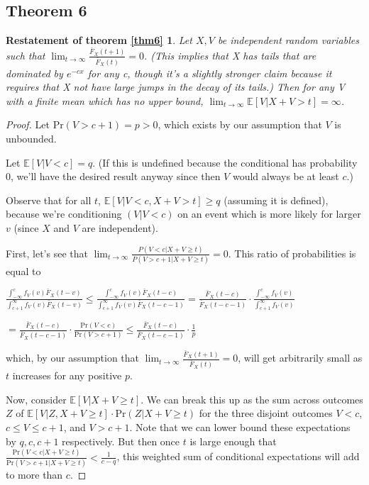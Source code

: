 \documentclass{article}
\begin{document}
\subsection{Theorem 6}
\newtheorem*{theorem6}{Restatement of theorem \ref{thm6}}
\begin{theorem6}
    Let $X, V$ be independent random variables such that $\lim_{t\to\infty}\frac{\bar{F}_X(t+1)}{\bar{F}_X(t)}=0$. (This implies that X has tails that are dominated by $e^{-cx}$ for any c, though it's a slightly stronger claim because it requires that X not have large jumps in the decay of its tails.)
    Then for any V with a finite mean which has no upper bound, $\lim_{t\to\infty}\mathbb{E}[V|X+V > t] = \infty$. 
\end{theorem6}
\begin{proof}
Let \(\text{Pr}(V>c+1)=p>0\), which exists by our assumption that \(V\) is unbounded.

Let \(\mathbb E[V|V<c] = q\). (If this is undefined because the conditional has probability \(0\), we'll have the desired result anyway since then \(V\) would always be at least \(c\).) 

Observe that for all \(t\), \(\mathbb E[V|V<c, X+V>t] \ge q\) (assuming it is defined), because we're conditioning \((V|V<c)\) on an event which is more likely for larger \(v\) (since \(X\) and \(V\) are independent). 

First, let's see that \(\lim_{t\to\infty}\frac{P(V<c|X+V\ge t)}{P(V>c+1|X+V\ge t)}=0\). This ratio of probabilities is equal to

\(\frac{\int_{-\infty}^c f_V(v)\bar F_X(t-v)}{\int_{c+1}^\infty f_V(v)\bar F_X(t-v)} \le \frac{\int_{-\infty}^c f_V(v)\bar F_X(t-c)}{\int_{c+1}^\infty f_V(v)\bar F_X(t-c-1)} = \frac{\bar F_X(t-c)}{\bar F_X(t-c-1)}\cdot \frac{\int_{-\infty}^c f_V(v)}{\int_{c+1}^\infty f_V(v)}\)

\(=\frac{\bar F_X(t-c)}{\bar F_X(t-c-1)}\cdot \frac{\text{Pr}(V<c)}{\text{Pr}(V>c+1)}\le \frac{\bar F_X(t-c)}{\bar F_X(t-c-1)}\cdot \frac1p\)

which, by our assumption that \(\lim_{t\to\infty}\frac{\bar{F}_X(t+1)}{\bar{F}_X(t)}=0\), will get arbitrarily small as \(t\) increases for any positive \(p\).

Now, consider \(\mathbb E[V|X+V\ge t]\). We can break this up as the sum across outcomes \(Z\) of \(\mathbb E[V|Z,X+V\ge t]\cdot \text{Pr}(Z | X+V\ge t)\) for the three disjoint outcomes \(V<c\), \(c\le V\le c+1\), and \(V>c+1\). Note that we can lower bound these expectations by \(q, c, c+1\) respectively. But then once \(t\) is large enough that \(\frac{\text{Pr}(V<c|X+V\ge t)}{\text{Pr}(V>c+1|X+V\ge t)}<\frac1{c-q}\),  this weighted sum of conditional expectations will add to more than \(c\).
\end{proof}
\end{document}
